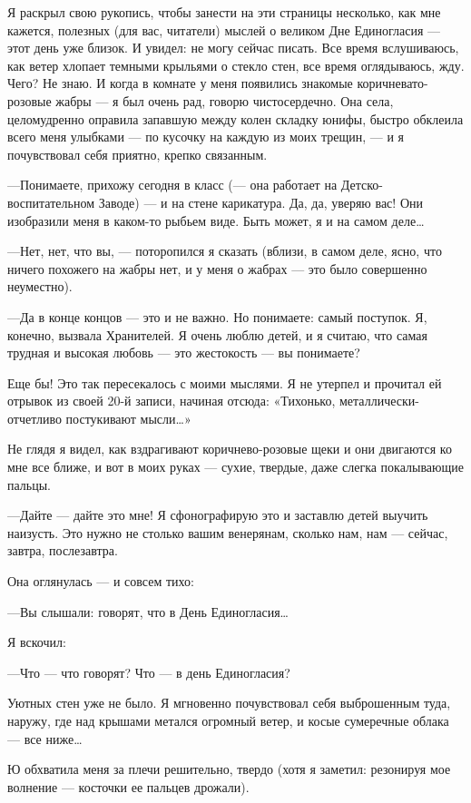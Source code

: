 \documentclass[11pt,openany]{book}
\begin{document}
Я раскрыл свою рукопись, чтобы занести на эти страницы несколько, как мне кажется, полезных (для вас, читатели) мыслей о великом Дне Единогласия --- этот день уже близок. И увидел: не могу сейчас писать. Все время вслушиваюсь, как ветер хлопает темными крыльями о стекло стен, все время оглядываюсь, жду. Чего? Не знаю. И когда в комнате у меня появились знакомые коричневато-розовые жабры --- я был очень рад, говорю чистосердечно. Она села, целомудренно оправила запавшую между колен складку юнифы, быстро обклеила всего меня улыбками --- по кусочку на каждую из моих трещин, --- и я почувствовал себя приятно, крепко связанным.

---Понимаете, прихожу сегодня в класс (--- она работает на Детско-воспитательном Заводе) --- и на стене карикатура. Да, да, уверяю вас! Они изобразили меня в каком-то рыбьем виде. Быть может, я и на самом деле\ldots{}

---Нет, нет, что вы, --- поторопился я сказать (вблизи, в самом деле, ясно, что ничего похожего на жабры нет, и у меня о жабрах --- это было совершенно неуместно).

---Да в конце концов --- это и не важно. Но понимаете: самый поступок. Я, конечно, вызвала Хранителей. Я очень люблю детей, и я считаю, что самая трудная и высокая любовь --- это жестокость --- вы понимаете?

Еще бы! Это так пересекалось с моими мыслями. Я не утерпел и прочитал ей отрывок из своей 20-й записи, начиная отсюда: «Тихонько, металлически-отчетливо постукивают мысли\ldots{}»

Не глядя я видел, как вздрагивают коричнево-розовые щеки и они двигаются ко мне все ближе, и вот в моих руках --- сухие, твердые, даже слегка покалывающие пальцы.

---Дайте --- дайте это мне! Я сфонографирую это и заставлю детей выучить наизусть. Это нужно не столько вашим венерянам, сколько нам, нам --- сейчас, завтра, послезавтра.

Она оглянулась --- и совсем тихо:

---Вы слышали: говорят, что в День Единогласия\ldots{}

Я вскочил:

---Что --- что говорят? Что --- в день Единогласия?

Уютных стен уже не было. Я мгновенно почувствовал себя выброшенным туда, наружу, где над крышами метался огромный ветер, и косые сумеречные облака --- все ниже\ldots{}

Ю обхватила меня за плечи решительно, твердо (хотя я заметил: резонируя мое волнение --- косточки ее пальцев дрожали).
\end{document}
